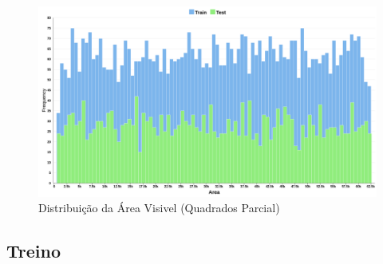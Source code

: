 \begin{figure}[H]
    \centering
    \includegraphics[width=1.0\linewidth]{imgs/Test_5/dataset_5/Partial_Squares_Area_Distribution_Hist.png}
    \caption{Distribuição da Área Visivel (Quadrados Parcial)}
    \label{fig:enter-label}
\end{figure}

\subsection{Treino}

